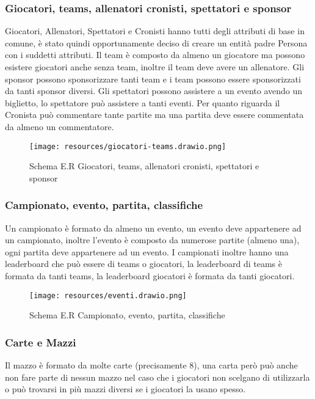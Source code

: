 \documentclass{article}
\begin{document}
\subsubsection{Giocatori, teams, allenatori cronisti, spettatori e sponsor}

Giocatori, Allenatori, Spettatori e Cronisti hanno tutti degli attributi di base in comune, è stato quindi opportunamente deciso di creare un entità padre Persona con i suddetti attributi. Il team è composto da almeno un giocatore ma possono esistere giocatori anche senza team, inoltre il team deve avere un allenatore. Gli sponsor possono sponsorizzare tanti team e i team possono essere sponsorizzati da tanti sponsor diversi. Gli spettatori possono assistere a un evento avendo un biglietto, lo spettatore può assistere a tanti eventi. Per quanto riguarda il Cronista può commentare tante partite ma una partita deve essere commentata da almeno un commentatore.

\begin{figure}
    \centering
    \texttt{[image: resources/giocatori-teams.drawio.png]}
    \caption{Schema E.R Giocatori, teams, allenatori cronisti, spettatori e sponsor}
\end{figure}

\subsubsection{Campionato, evento, partita, classifiche}

Un campionato è formato da almeno un evento, un evento deve appartenere ad un campionato, inoltre l'evento è composto da numerose partite (almeno una), ogni partita deve appartenere ad un evento. I campionati inoltre hanno una leaderboard che può essere di teams o giocatori, la leaderboard di teams è formata da tanti teams, la leaderboard giocatori è formata da tanti giocatori.

\begin{figure}
    \centering
    \texttt{[image: resources/eventi.drawio.png]}
    \caption{Schema E.R Campionato, evento, partita, classifiche}
\end{figure}

\subsubsection{Carte e Mazzi}

Il mazzo è formato da molte carte (precisamente 8), una carta però può anche non fare parte di nessun mazzo nel caso che i giocatori non scelgano di utilizzarla o può trovarsi in più mazzi diversi se i giocatori la usano spesso.
\end{document}
